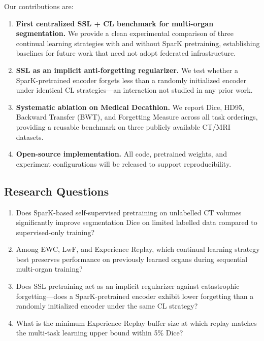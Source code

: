 \documentclass[conference]{IEEEtran}
\begin{document}
Our contributions are:

\begin{enumerate}
    \item \textbf{First centralized SSL + CL benchmark for multi-organ segmentation.} We provide a clean experimental comparison of three continual learning strategies with and without SparK pretraining, establishing baselines for future work that need not adopt federated infrastructure.
    \item \textbf{SSL as an implicit anti-forgetting regularizer.} We test whether a SparK-pretrained encoder forgets less than a randomly initialized encoder under identical CL strategies—an interaction not studied in any prior work.
    \item \textbf{Systematic ablation on Medical Decathlon.} We report Dice, HD95, Backward Transfer (BWT), and Forgetting Measure across all task orderings, providing a reusable benchmark on three publicly available CT/MRI datasets.
    \item \textbf{Open-source implementation.} All code, pretrained weights, and experiment configurations will be released to support reproducibility.
\end{enumerate}

\subsection{Research Questions}

\begin{enumerate}
    \item[\textbf{RQ1}] Does SparK-based self-supervised pretraining on unlabelled CT volumes significantly improve segmentation Dice on limited labelled data compared to supervised-only training?
    \item[\textbf{RQ2}] Among EWC, LwF, and Experience Replay, which continual learning strategy best preserves performance on previously learned organs during sequential multi-organ training?
    \item[\textbf{RQ3}] Does SSL pretraining act as an implicit regularizer against catastrophic forgetting—does a SparK-pretrained encoder exhibit lower forgetting than a randomly initialized encoder under the same CL strategy?
    \item[\textbf{RQ4}] What is the minimum Experience Replay buffer size at which replay matches the multi-task learning upper bound within 5\% Dice?
\end{enumerate}
\end{document}
